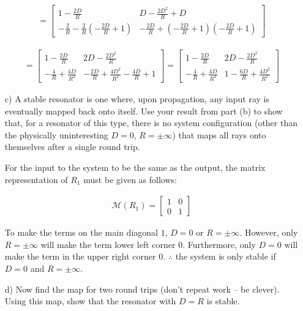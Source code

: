 \documentclass[fleqn]{article}
\begin{document}
\begin{enumerate}[nolistsep]
			\begin{align*}
				= \begin{bmatrix}1 - \frac{2D}{R} & D - \frac{2D^2}{R} + D\\ -\frac{2}{R} - \frac{2}{R}(-\frac{2D}{R} + 1) & -\frac{2D}{R} + (-\frac{2D}{R}+1)(-\frac{2D}{R}+1)\end{bmatrix}
			\end{align*}
			
			\begin{align*}
				= \begin{bmatrix}1 - \frac{2D}{R} & 2D - \frac{2D^2}{R}\\ -\frac{4}{R} +\frac{4D}{R^2} & -\frac{2D}{R} + \frac{4D^2}{R^2} -\frac{4D}{R} + 1\end{bmatrix} = \begin{bmatrix}1 - \frac{2D}{R} & 2D - \frac{2D^2}{R}\\ -\frac{4}{R} + \frac{4D}{R^2} & 1 - \frac{6D}{R} + \frac{4D^2}{R^2}\end{bmatrix}
			\end{align*}
			
			\item[c)] A stable resonator is one where, upon propagation, any input ray is eventually mapped back onto itself. Use your result from part (b) to show that, for a resonator of this type, there is no system configuration (other than the physically uninteresting $D = 0$, $R = \pm \infty$) that maps all rays onto themselves after a single round trip.
			
			\pagebreak
			For the input to the system to be the same as the output, the matrix representation of $R_1$ must be given as follows:
			
			\begin{align*}
				\mathcal{M}(R_1) = \begin{bmatrix}1 & 0\\ 0 & 1\end{bmatrix}
			\end{align*}
			
			To make the terms on the main diagonal $1$, $D = 0$ or $R = \pm\infty$. However, only $R = \pm\infty$ will make the term lower left corner $0$. Furthermore, only $D = 0$ will make the term in the upper right corner $0$. $\therefore$ the system is only stable if $D=0$ and $R=\pm\infty$.			
			
			\item[d)] Now find the map for two round trips (don’t repeat work – be clever). Using this map, show that the resonator with $D = R$ is stable.
			

\end{enumerate}
\end{document}
